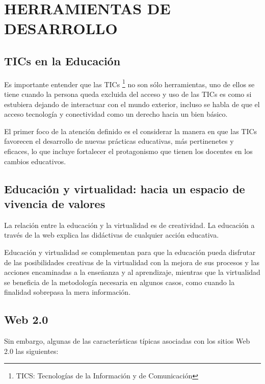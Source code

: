 \chapter{HERRAMIENTAS DE DESARROLLO}

\section{TICs en la Educaci\'{o}n}

Es importante entender que las TICs \footnote{TICS: Tecnolog\'{i}as de la 
Informaci\'{o}n y de Comunicaci\'{o}n} no son s\'{o}lo herramientas, uno de ellos
se tiene cuando la persona queda excluida del acceso y uso de las TICs es como si
estubiera dejando de interactuar con el mundo exterior, incluso se habla de que 
el acceso tecnolog\'{i}a y conectividad como un derecho hacia un bien b\'{a}sico.

El primer foco de la atención definido es el considerar la manera en que las TICs
favorecen el desarrollo de nuevas pr\'{a}cticas educativas, más pertinenetes y eficaces,
lo que incluye fortalecer el protagonismo que tienen los docentes en los cambios
educativos.\cite{severin2013enfoques}

\section{Educaci\'{o}n y virtualidad: hacia un espacio de vivencia de valores}

La relaci\'{o}n entre la educaci\'{o}n y la virtualidad es de creatividad. La 
educaci\'{o}n a trav\'{e}s de la web explica las did\'{a}ctivas de cualquier 
acci\'{o}n educativa. 

Educaci\'{o}n y virtualidad se complementan para que la educaci\'{o}n pueda 
disfrutar de las posibilidades creativas de la virtualidad con la mejora de sus
procesos y las acciones encaminadas a la ense\"{n}anza y al aprendizaje, mientras
que la virtualidad se beneficia de la metodolog\'{i}a necesaria en algunos casos,
como cuando la finalidad sobrepasa la mera informaci\'{o}n.
\cite{duart2000aprender}

\section{Web 2.0}

Sin embargo, algunas de las caracter\'{i}sticas t\'{i}picas asociadas con los sitios
Web 2.0 las siguientes:

